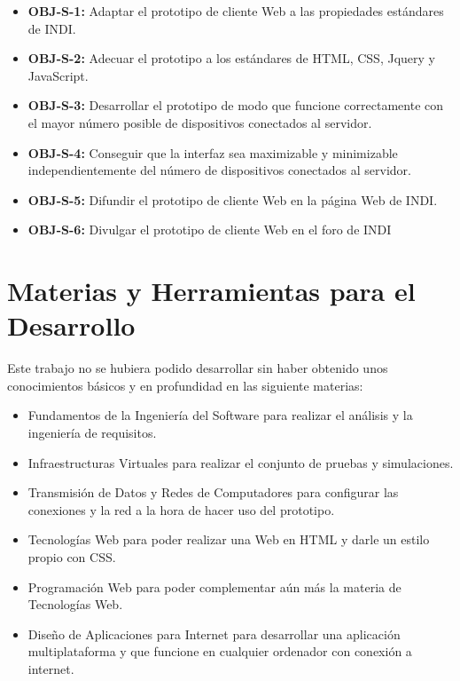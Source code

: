 \begin{itemize}
  \item \textbf{OBJ-S-1:} Adaptar el prototipo de cliente Web a las propiedades estándares de INDI.
  \item \textbf{OBJ-S-2:} Adecuar el prototipo a los estándares de HTML, CSS, Jquery y JavaScript.
  \item \textbf{OBJ-S-3:} Desarrollar el prototipo de modo que funcione correctamente con el mayor número posible de dispositivos conectados al servidor.
  \item \textbf{OBJ-S-4:} Conseguir que la interfaz sea maximizable y minimizable independientemente del número de dispositivos conectados al servidor.
  \item \textbf{OBJ-S-5:} Difundir el prototipo de cliente Web en la página Web de INDI.
  \item \textbf{OBJ-S-6:} Divulgar el prototipo de cliente Web en el foro de INDI
\end{itemize}


\section{Materias y Herramientas para el Desarrollo}
Este trabajo no se hubiera podido desarrollar sin haber obtenido unos conocimientos básicos y en profundidad en las siguiente materias:
\begin{itemize}
  \item Fundamentos de la Ingeniería del Software para realizar el análisis y la ingeniería de requisitos.
  \item Infraestructuras Virtuales para realizar el conjunto de pruebas y simulaciones.
  \item Transmisión de Datos y Redes de Computadores para configurar las conexiones y la red a la hora de hacer uso del prototipo.
  \item Tecnologías Web para poder realizar una Web en HTML y darle un estilo propio con CSS.
  \item Programación Web para poder complementar aún más la materia de Tecnologías Web.
  \item Diseño de Aplicaciones para Internet para desarrollar una aplicación multiplataforma y que funcione en cualquier ordenador con conexión a internet.
\end{itemize}

